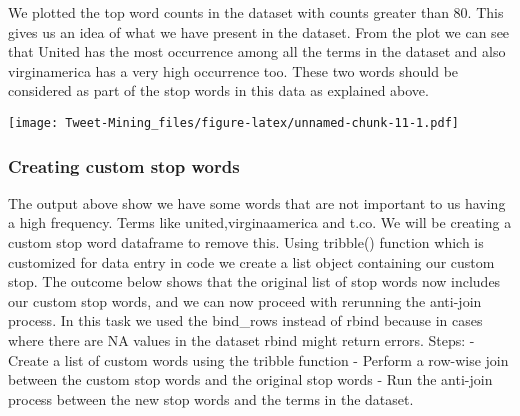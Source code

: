 \documentclass[
]{article}
\newenvironment{Shaded}{\begin{snugshade}}{\end{snugshade}}
\newcommand{\CommentTok}[1]{\textcolor[rgb]{0.56,0.35,0.01}{\textit{#1}}}
\newcommand{\DataTypeTok}[1]{\textcolor[rgb]{0.13,0.29,0.53}{#1}}
\newcommand{\DecValTok}[1]{\textcolor[rgb]{0.00,0.00,0.81}{#1}}
\newcommand{\KeywordTok}[1]{\textcolor[rgb]{0.13,0.29,0.53}{\textbf{#1}}}
\newcommand{\NormalTok}[1]{#1}
\newcommand{\OperatorTok}[1]{\textcolor[rgb]{0.81,0.36,0.00}{\textbf{#1}}}
\newcommand{\StringTok}[1]{\textcolor[rgb]{0.31,0.60,0.02}{#1}}
\begin{document}
We plotted the top word counts in the dataset with counts greater than
80. This gives us an idea of what we have present in the dataset. From
the plot we can see that United has the most occurrence among all the
terms in the dataset and also virginamerica has a very high occurrence
too. These two words should be considered as part of the stop words in
this data as explained above.

\begin{Shaded}
\end{Shaded}

\texttt{[image: Tweet-Mining\_files/figure-latex/unnamed-chunk-11-1.pdf]}

\hypertarget{creating-custom-stop-words}{%
\subsubsection{Creating custom stop
words}\label{creating-custom-stop-words}}

The output above show we have some words that are not important to us
having a high frequency. Terms like united,virginaamerica and t.co. We
will be creating a custom stop word dataframe to remove this. Using
tribble() function which is customized for data entry in code we create
a list object containing our custom stop. The outcome below shows that
the original list of stop words now includes our custom stop words, and
we can now proceed with rerunning the anti-join process. In this task we
used the bind\_rows instead of rbind because in cases where there are NA
values in the dataset rbind might return errors. Steps: - Create a list
of custom words using the tribble function - Perform a row-wise join
between the custom stop words and the original stop words - Run the
anti-join process between the new stop words and the terms in the
dataset.
\end{document}
